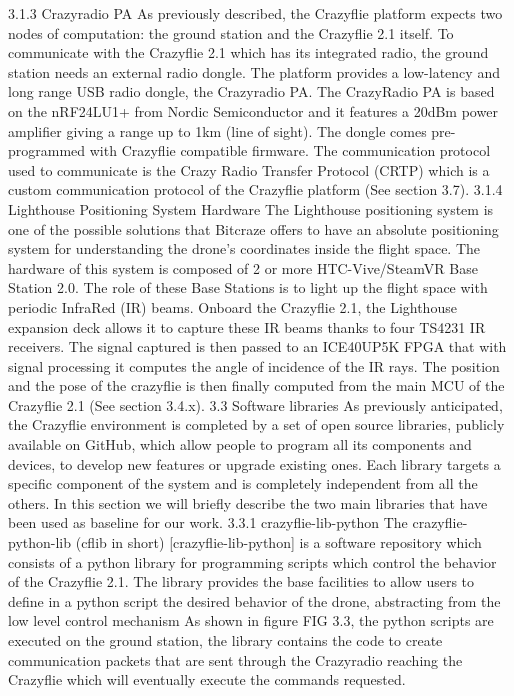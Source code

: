 3.1.3 Crazyradio PA
As previously described, the Crazyflie platform expects two nodes of computation: the ground station and the Crazyflie 2.1 itself. To communicate with the Crazyflie 2.1 which has its integrated radio, the ground station needs an external radio dongle. The platform provides a low-latency and long range USB radio dongle, the Crazyradio PA. The CrazyRadio PA is based on the nRF24LU1+ from Nordic Semiconductor and it features a 20dBm power amplifier giving a range up to 1km (line of sight). The dongle comes pre-programmed with Crazyflie compatible firmware.
The communication protocol used to communicate is the Crazy Radio Transfer Protocol (CRTP) which is a custom communication protocol of the Crazyflie platform (See section 3.7).
3.1.4 Lighthouse Positioning System Hardware
The Lighthouse positioning system is one of the possible solutions that Bitcraze offers to have an absolute positioning system for understanding the drone’s coordinates inside the flight space. The hardware of this system is composed of 2 or more HTC-Vive/SteamVR Base Station 2.0. The role of these Base Stations is to light up the flight space with periodic InfraRed (IR) beams.
Onboard the Crazyflie 2.1, the Lighthouse expansion deck allows it to capture these IR beams thanks to four TS4231 IR receivers. The signal captured is then passed to an ICE40UP5K FPGA that with signal processing it computes the angle of incidence of the IR rays. The position and the pose of the crazyflie is then finally computed from the main MCU of the Crazyflie 2.1 (See section 3.4.x).
3.3 Software libraries
As previously anticipated, the Crazyflie environment is completed by a set of open source libraries, publicly available on GitHub, which allow people to program all its components and devices, to develop new features or upgrade existing ones. Each library targets a specific component of the system and is completely independent from all the others. 
In this section we will briefly describe the two main libraries that have been used as baseline for our work. 
3.3.1 crazyflie-lib-python
The crazyflie-python-lib (cflib in short) [crazyflie-lib-python] is a software repository which consists of a python library for programming scripts which control the behavior of the Crazyflie 2.1.
The library provides the base facilities to allow users to define in a python script the desired behavior of the drone, abstracting from the low level control mechanism
As shown in figure {FIG 3.3}, the python scripts are executed on the ground station, the library contains the code to create communication packets that are sent through the Crazyradio reaching the Crazyflie which will eventually execute the commands requested. 

